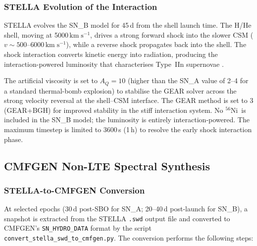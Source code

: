 \documentclass[11pt, a4paper]{article}
\newcommand{\kms}{\ensuremath{\mathrm{km\;s^{-1}}}}
\newcommand{\Ni}{\ensuremath{^{56}\mathrm{Ni}}}
\begin{document}
\subsubsection{STELLA Evolution of the Interaction}
\label{subsubsec:stella_sn_b}

STELLA evolves the SN\_B model for 45\,d from the shell launch time.
The H/He shell, moving at 5000\,$\kms$, drives a strong forward shock
into the slower CSM ($v \sim 500$--$6000\,\kms$), while a reverse shock
propagates back into the shell.  The shock interaction converts kinetic
energy into radiation, producing the interaction-powered luminosity that
characterises Type~IIn supernovae \citep{Dessart2016, Chugai2001}.

The artificial viscosity is set to $A_Q = 10$ (higher than the SN\_A
value of 2--4 for a standard thermal-bomb explosion) to stabilise the
GEAR solver across the strong velocity reversal at the shell--CSM
interface.  The GEAR method is set to 3 (GEAR+BGH) for improved stability
in the stiff interaction system.  No \Ni\ is included in the SN\_B model;
the luminosity is entirely interaction-powered.  The maximum timestep is
limited to 3600\,s (1\,h) to resolve the early shock interaction phase.

\subsection{CMFGEN Non-LTE Spectral Synthesis}
\label{subsec:cmfgen}

\subsubsection{STELLA-to-CMFGEN Conversion}
\label{subsubsec:conversion}

At selected epochs (30\,d post-SBO for SN\_A; 20--40\,d post-launch for
SN\_B), a snapshot is extracted from the STELLA \texttt{.swd} output file
and converted to CMFGEN's \texttt{SN\_HYDRO\_DATA} format by the script
\texttt{convert\_stella\_swd\_to\_cmfgen.py}.  The conversion performs
the following steps:
\end{document}
